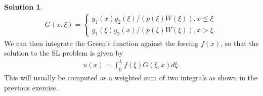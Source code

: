 \documentclass[12pt]{article}
\theoremstyle{definition}
\newtheorem{sol}{Solution}
\theoremstyle{remark}
\begin{document}
\begin{sol}
     \begin{align*}
         G(x, \xi) =
         \begin{cases}
             y_{1}(x) y_{2}(\xi) / (p(\xi) W(\xi)), x \leq \xi\\
             y_{1}(\xi) y_{2}(x) / (p(\xi) W(\xi)), x > \xi.
         \end{cases}
     \end{align*}
We can then integrate the Green's function against the forcing $f(x)$, so that the solution to the SL problem is given by
     \begin{align*}
         u(x) = \int_{0}^{L} f(\xi) G(\xi, x)d\xi.
     \end{align*}
     This will usually be computed as a weighted sum of two integrals as shown in the previous exercise.
 \end{sol}
\end{document}

